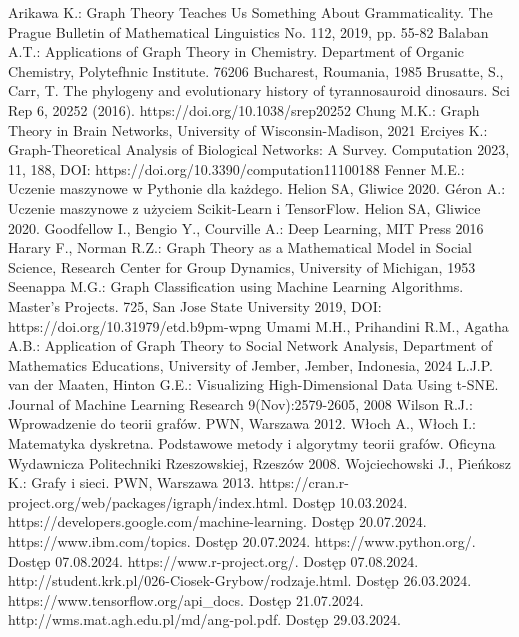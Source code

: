 
\begin{thebibliography}{4}
     Arikawa K.: Graph Theory Teaches Us Something About Grammaticality. The Prague Bulletin of Mathematical Linguistics No. 112, 2019, pp. 55-82
     Balaban A.T.: Applications of Graph Theory in Chemistry. Department of Organic Chemistry, Polytefhnic Institute. 76206 Bucharest, Roumania, 1985
     Brusatte, S., Carr, T. The phylogeny and evolutionary history of tyrannosauroid dinosaurs. Sci Rep 6, 20252 (2016). https://doi.org/10.1038/srep20252
     Chung M.K.: Graph Theory in Brain Networks, University of Wisconsin-Madison, 2021 
     Erciyes K.: Graph-Theoretical Analysis of Biological Networks: A Survey. Computation 2023, 11, 188, DOI: https://doi.org/10.3390/computation11100188
     Fenner M.E.: Uczenie maszynowe w Pythonie dla każdego. Helion SA, Gliwice 2020.
     Géron A.: Uczenie maszynowe z użyciem Scikit-Learn i TensorFlow. Helion SA, Gliwice 2020.
     Goodfellow I., Bengio Y., Courville A.: Deep Learning, MIT Press 2016
     Harary F., Norman R.Z.: Graph Theory as a Mathematical Model in Social Science, Research Center for Group Dynamics, University of Michigan, 1953
     Seenappa M.G.: Graph Classification using Machine Learning Algorithms. Master's Projects. 725, San Jose State University 2019, DOI: https://doi.org/10.31979/etd.b9pm-wpng
     Umami M.H., Prihandini R.M., Agatha A.B.: Application of Graph Theory to Social Network Analysis, Department of Mathematics Educations, University of Jember, Jember, Indonesia, 2024
     L.J.P. van der Maaten, Hinton G.E.: Visualizing High-Dimensional Data Using t-SNE. Journal of Machine Learning Research 9(Nov):2579-2605, 2008
     Wilson R.J.: Wprowadzenie do teorii grafów. PWN, Warszawa 2012.
     Włoch A., Włoch I.: Matematyka dyskretna. Podstawowe metody i algorytmy teorii grafów. Oficyna Wydawnicza Politechniki Rzeszowskiej, Rzeszów 2008.
     Wojciechowski J., Pieńkosz K.: Grafy i sieci. PWN, Warszawa 2013.
     https://cran.r-project.org/web/packages/igraph/index.html. Dostęp 10.03.2024.
     https://developers.google.com/machine-learning. Dostęp 20.07.2024.
     https://www.ibm.com/topics. Dostęp 20.07.2024.
     https://www.python.org/. Dostęp 07.08.2024.
     https://www.r-project.org/. Dostęp 07.08.2024.
     http://student.krk.pl/026-Ciosek-Grybow/rodzaje.html. Dostęp 26.03.2024.
     https://www.tensorflow.org/api\_docs. Dostęp 21.07.2024.
     http://wms.mat.agh.edu.pl/\texttildelow md/ang-pol.pdf. Dostęp 29.03.2024.
\end{thebibliography}